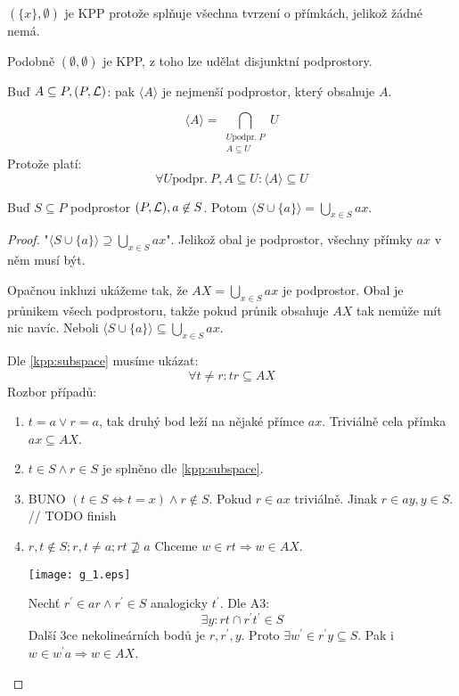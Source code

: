 \begin{observation}
	$(\{ x \}, \emptyset)$ je KPP protože splňuje všechna tvrzení o přímkách, jelikož žádné nemá.

	Podobně $( \emptyset, \emptyset)$ je KPP, z toho lze udělat disjunktní podprostory.
\end{observation}

\begin{definition}[Obal]
    Buď $A \subseteq P, (P, \operatorname{\mathcal{L}})$: pak $\langle A \rangle$ je nejmenší podprostor, který obsahuje $A$.

    \[ \langle A \rangle = \bigcap_{\substack{U \text{podpr.}\ P \\ A \subseteq U }} U \]
    Protože platí:
    \[ \forall U \text{podpr.}\ P, A \subseteq U: \langle A \rangle \subseteq U \]
\end{definition}

\begin{lemma}\label{kpp:point_add_sub}
    Buď $S \subseteq P$ podprostor $(P, \operatorname{\mathcal{L}}), a \not\in S$.
    Potom $\langle S \cup \{a\} \rangle = \bigcup_{x\in S}ax$.
\end{lemma}
\begin{proof}
	"$\langle S \cup \{a\} \rangle \supseteq \bigcup_{x\in S}ax$".
	Jelikož obal je podprostor, všechny přímky $ax$ v něm musí být.

	Opačnou inkluzi ukážeme tak, že $AX = \bigcup_{x\in S} ax$ je podprostor.
	Obal je průnikem všech podprostoru, takže pokud průnik obsahuje $AX$ tak nemůže mít nic navíc.
	Neboli $\langle S \cup \{a\} \rangle \subseteq \bigcup_{x\in S}ax$.

	Dle \cref{kpp:subspace} musíme ukázat:
	\[ \forall t \ne r: tr \subseteq AX \]
	Rozbor případů:
	\begin{enumerate}
		\item $t = a \lor r = a$, tak druhý bod leží na nějaké přímce $ax$.
			Triviálně cela přímka $ax \subseteq AX$.
		\item $t \in S \land r \in S$ je splněno dle \cref{kpp:subspace}.
		\item BUNO $(t \in S \iff t = x) \land r \not\in S$.
			Pokud $r \in ax$ triviálně.
			Jinak $r \in ay, y \in S$.
			// TODO finish
		\item $r, t \notin S; r, t \ne a; rt \nsupseteq a$
			Chceme $w \in rt \Rightarrow w \in AX$.

		\texttt{[image: g\_1.eps]}

		Nechť $r^{\prime} \in ar \land r^{\prime} \in S$ analogicky $t^{\prime}$.
		Dle A3:
		\[ \exists y: rt \cap r^{\prime}t^{\prime} \in S \]
		Další 3ce nekolineárních bodů je $r, r^{\prime}, y$.
		Proto $\exists w^{\prime} \in r^{\prime}y \subseteq S$.
		Pak i $w \in w^{\prime}a \Rightarrow w \in AX$.
	\end{enumerate}
\end{proof}

